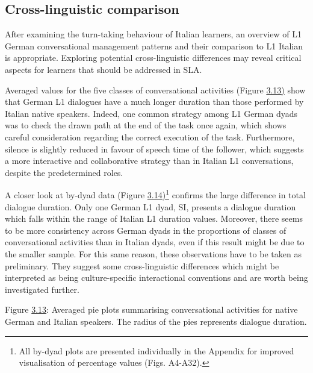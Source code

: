 \subsection{Cross-linguistic comparison}
\hypertarget{Toc191305939}{}
After examining the turn-taking behaviour of Italian learners, an overview of L1 German conversational management patterns and their comparison to L1 Italian is appropriate. Exploring potential cross-linguistic differences may reveal critical aspects for learners that should be addressed in SLA.

Averaged values for the five classes of conversational activities (Figure \hyperlink{bookmark158}{3.13)} show that German L1 dialogues have a much longer duration than those performed by Italian native speakers. Indeed, one common strategy among L1 German dyads was to check the drawn path at the end of the task once again, which shows careful consideration regarding the correct execution of the task. Furthermore, silence is slightly reduced in favour of speech time of the follower, which suggests a more interactive and collaborative strategy than in Italian L1 conversations, despite the predetermined roles.

A closer look at by-dyad data (Figure \hyperlink{bookmark159}{3.14)}\footnote{All by-dyad plots are presented individually in the Appendix for improved visualisation of percentage values (Figs. A4-A32).} confirms the large difference in total dialogue duration. Only one German L1 dyad, SI, presents a dialogue duration which falls within the range of Italian L1 duration values. Moreover, there seems to be more consistency across German dyads in the proportions of classes of conversational activities than in Italian dyads, even if this result might be due to the smaller sample. For this same reason, these observations have to be taken as preliminary. They suggest some cross-linguistic differences which might be interpreted as being culture-specific interactional conventions and are worth being investigated further.

  
 

\begin{stylecaption}
Figure \hyperlink{bookmark158}{3.13}: Averaged pie plots summarising conversational activities for native German and Italian speakers. The radius of the pies represents dialogue duration.
\end{stylecaption}

